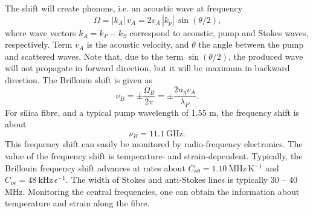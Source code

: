 \documentclass{standalone}
\begin{document}
The shift will create phonons, i.e. an acoustic wave at frequency
\begin{equation}
\Omega = \left|k_A\right| \, v_A = 2 v_A \, \left|k_p\right| \, \sin\left(\theta / 2 \right) \textrm{,}
\end{equation}
where wave vectors $k_A = k_P - k_S$ correspond to acoustic, pump and Stokes waves, respectively. Term $v_A$ is the acoustic velocity, and $\theta$ the angle between the pump and scattered waves. Note that, due to the term $\sin\left(\theta / 2\right)$, the produced wave will not propagate in forward direction, but it will be maximum in backward direction. The Brillouin shift is given as
\begin{equation}
\nu_B = \pm \frac{\Omega_B}{2 \pi} = \pm \frac{2 n_g v_A}{\lambda_P} \textrm{.}
\end{equation}
For silica fibre, and a typical pump wavelength of 1.55 \textmu m, the frequency shift is about 
\begin{equation}
\nu_B = \SI{11.1}{\giga \hertz} \textrm{.}
\end{equation}
This frequency shift can easily be monitored by radio-frequency electronics. The value of the frequency shift is temperature- and strain-dependent. Typically, the Brillouin frequency shift advances at rates about $C_{\nu\theta} = \SI{1.10}{\mega \hertz \, \kelvin^{-1}}$ and $C_{\nu\epsilon} = \SI{48}{\kilo \hertz \, \epsilon^{-1}}$. The width of Stokes and anti-Stokes lines is typically 30 -- 40 MHz. Monitoring the central frequencies, one can obtain the information about temperature and strain along the fibre. \\
\end{document}
